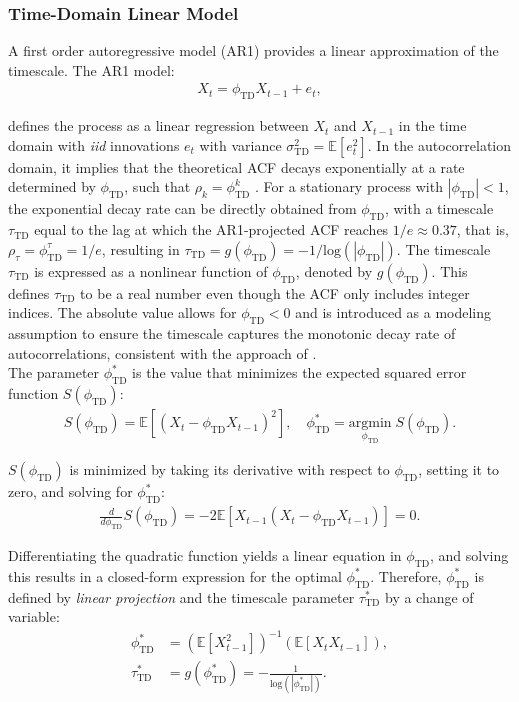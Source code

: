 \documentclass[9pt]{article}
\newcommand{\phitd}{\phi_{\scriptscriptstyle\text{TD}}}
\newcommand{\tautd}{\tau_{\scriptscriptstyle\text{TD}}}
\newcommand{\sigmatd}{\sigma_{\scriptscriptstyle\text{TD}}}
\begin{document}
\subsubsection{Time-Domain Linear Model}\label{sec:time-domain-linear-model}
A first order autoregressive model (AR1) provides a linear approximation of the timescale. The AR1 model:
\begin{align}\label{eq:ar1}
    X_t = \phitd X_{t-1} + e_t,
\end{align}

\noindent defines the process as a linear regression between $X_t$ and $X_{t-1}$ in the time domain with \textit{iid} innovations $e_t$ with variance $\sigmatd^2 = \mathbb{E}[e_t^2]$. In the autocorrelation domain, it implies that the theoretical ACF decays exponentially at a rate determined by $\phitd$, such that $\rho_k = \phitd^k$ \citep[Chapter~14.22]{hansen_econometrics_2022}. For a stationary process with $|\phitd|<1$, the exponential decay rate can be directly obtained from $\phitd$, with a timescale $\tautd$ equal to the lag at which the AR1-projected ACF reaches $1/e\approx 0.37$, that is,  $\rho_\tau = \phitd^\tau = 1/e$, resulting in $\tautd = g(\phitd) = -1/\text{log}(|\phitd|)$. The timescale $\tautd$ is expressed as a nonlinear function of $\phitd$, denoted by $g(\phitd)$. This defines $\tautd$ to be a real number even though the ACF only includes integer indices. The absolute value allows for $\phitd<0$ and is introduced as a modeling assumption to ensure the timescale captures the monotonic decay rate of autocorrelations, consistent with the approach of \citet{murray_hierarchy_2014}.\\

The parameter $\phitd^*$ is the value that minimizes the expected squared error function $S(\phitd)$:
\begin{align}
    S(\phitd) = \mathbb{E}[(X_t - \phitd X_{t-1})^2],\quad \phitd^* = \underset{\phitd}{\text{argmin}} \; S(\phitd).
\end{align}

\noindent $S(\phitd)$ is minimized by taking its derivative with respect to $\phitd$, setting it to zero, and solving for $\phitd^*$:
\begin{align}
    \frac{d}{d\phitd} S(\phitd) = -2 \mathbb{E}[X_{t-1}(X_t - \phitd X_{t-1})] = 0.
\end{align}

\noindent Differentiating the quadratic function yields a linear equation in $\phitd$, and solving this results in a closed-form expression for the optimal $\phitd^*$. Therefore, $\phitd^*$ is defined by \textit{linear projection} and the timescale parameter $\tautd^*$ by a change of variable:
\begin{align}
    \phitd^* &= (\mathbb{E}[X_{t-1}^2])^{-1}(\mathbb{E}[X_t X_{t-1}]) \label{eq:ar1-phi},\\
    \tautd^* &= g(\phitd^*) = -\frac{1}{\text{log}(|\phitd^*|)}. \label{eq:ar1-tau}
\end{align}
\end{document}
